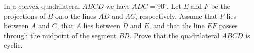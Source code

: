 In a convex quadrilateral $ABCD$ we have $ADC = 90^{\circ}$. Let $E$ and $F$ be the projections of $B$ onto the lines $AD$ and $AC$,  respectively. Assume that $F$ lies between $A$ and $C$,  that $A$ lies between $D$ and $E$,  and that the line $EF$ passes through the midpoint of the segment $BD$. Prove that the quadrilateral $ABCD$ is cyclic.